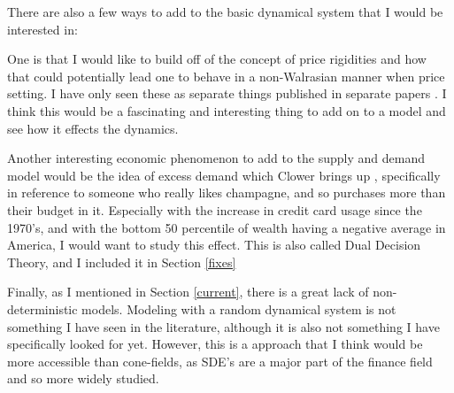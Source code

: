 \documentclass{article}
\begin{document}
There are also a few ways to add to the basic dynamical system that I would be interested in:

One is that I would like to build off of the concept of price rigidities and how that could potentially lead one to behave in a non-Walrasian manner when price setting. I have only seen these as separate things published in separate papers \cite{ball_real_1990, clower_keynes_1960}. I think this would be a fascinating and interesting thing to add on to a model and see how it effects the dynamics. 

Another interesting economic phenomenon to add to the supply and demand model would be the idea of excess demand which Clower brings up \cite{clower_coordination_1984}, specifically in reference to someone who really likes champagne, and so purchases more than their budget in it. Especially with the increase in credit card usage since the 1970's, %
and with the bottom 50 percentile of wealth having a negative average in America, I would want to study this effect. This is also called Dual Decision Theory, and I included it in Section \ref{fixes}

Finally, as I mentioned in Section \ref{current}, there is a great lack of non-deterministic models. Modeling with a random dynamical system is not something I have seen in the literature, although it is also not something I have specifically looked for yet. However, this is a approach that I think would be more accessible than cone-fields, as SDE's are a major part of the finance field and so more widely studied.



\end{document}
